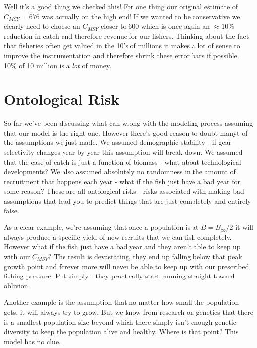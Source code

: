 \documentclass[11pt,a5paper]{book}
\begin{document}
Well it's a good thing we checked this! For one thing our original estimate of $C_{MSY}=676$ was actually on the high end! If we wanted to be conservative we clearly need to choose an $C_{MSY}$ closer to 600 which is once again an $\approx 10\%$ reduction in catch and therefore revenue for our fishers. Thinking about the fact that fisheries often get valued in the 10's of millions it makes a lot of sense to improve the instrumentation and therefore shrink these error bars if possible. 10\% of 10 million is a \textit{lot} of money. 
\newline

\section{Ontological Risk}

So far we've been discussing what can wrong with the modeling process assuming that our model is the right one. However there's good reason to doubt manyt of the assumptions we just made. We assumed demographic stability - if gear selectivity changes year by year this assumption will break down. We assumed that the ease of catch is just a function of biomass - what about technological developments? We also assumed absolutely no randomness in the amount of recruitment that happens each year - what if the fish just have a bad year for some reason? These are all ontological risks - risks associated with making bad assumptions that lead you to predict things that are just completely and entirely false. 
\newline

As a clear example, we're assuming that once a population is at $B=B_\infty / 2$ it will always produce a specific yield of new recruits that we can fish completely. However what if the fish just have a bad year and they aren't able to keep up with our $C_{MSY}$? The result is devastating, they end up falling below that peak growth point and forever more will never be able to keep up with our prescribed fishing pressure. Put simply - they practically start running straight toward oblivion. 
\newline

Another example is the assumption that no matter how small the population gets, it will always try to grow. But we know from research on genetics that there is a smallest population size beyond which there simply isn't enough genetic diversity to keep the population alive and healthy. Where is that point? This model has no clue. 
\newline
\end{document}
